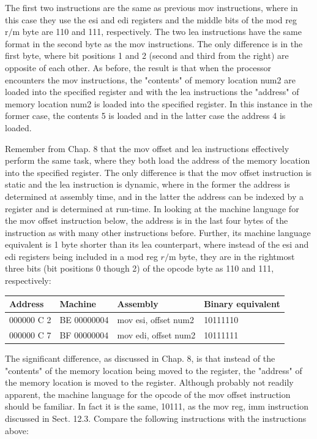 \documentclass[10pt]{article}
\begin{document}
The first two instructions are the same as previous mov instructions, where in this case they use the esi and edi registers and the middle bits of the mod reg $\mathrm{r} / \mathrm{m}$ byte are 110 and 111, respectively. The two lea instructions have the same format in the second byte as the mov instructions. The only difference is in the first byte, where bit positions 1 and 2 (second and third from the right) are opposite of each other. As before, the result is that when the processor encounters the mov instructions, the "contents" of memory location num2 are loaded into the specified register and with the lea instructions the "address" of memory location num2 is loaded into the specified register. In this instance in the former case, the contents 5 is loaded and in the latter case the address 4 is loaded.

Remember from Chap. 8 that the mov offset and lea instructions effectively perform the same task, where they both load the address of the memory location into the specified register. The only difference is that the mov offset instruction is static and the lea instruction is dynamic, where in the former the address is determined at assembly time, and in the latter the address can be indexed by a register and is determined at run-time. In looking at the machine language for the mov offset instruction below, the address is in the last four bytes of the instruction as with many other instructions before. Further, its machine language equivalent is 1 byte shorter than its lea counterpart, where instead of the esi and edi registers being included in a mod reg $r / \mathrm{m}$ byte, they are in the rightmost three bits (bit positions 0 though 2) of the opcode byte as 110 and 111, respectively:

\begin{center}
\begin{tabular}{|l|l|l|l|}
\hline
Address & Machine & Assembly & Binary equivalent \\
\hline
000000 C 2 & BE 00000004 & mov esi, offset num2 & 10111110 \\
\hline
000000 C 7 & BF 00000004 & mov edi, offset num2 & 10111111 \\
\hline
\end{tabular}
\end{center}

The significant difference, as discussed in Chap. 8, is that instead of the "contents" of the memory location being moved to the register, the "address" of the memory location is moved to the register. Although probably not readily apparent, the machine language for the opcode of the mov offset instruction should be familiar. In fact it is the same, 10111, as the mov reg, imm instruction discussed in Sect. 12.3. Compare the following instructions with the instructions above:
\end{document}

